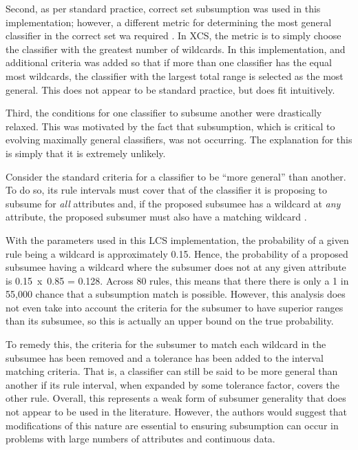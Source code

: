 \documentclass[11pt]{article}
\begin{document}
Second, as per standard practice, correct set subsumption was used in this implementation; however, a different metric for determining the most general classifier in the correct set wa required \cite{Butz2000}. In XCS, the metric is to simply choose the classifier with the greatest number of wildcards. In this implementation, and additional criteria was added so that if more than one classifier has the equal most wildcards, the classifier with the largest total range is selected as the most general. This does not appear to be standard practice, but does fit intuitively.

Third, the conditions for one classifier to subsume another were drastically relaxed. This was motivated by the fact that subsumption, which is critical to evolving maximally general classifiers, was not occurring. The explanation for this is simply that it is extremely unlikely.

Consider the standard criteria for a classifier to be ``more general'' than another. To do so, its rule intervals must cover that of the classifier it is proposing to subsume for \textit{all} attributes and, if the proposed subsumee has a wildcard at \textit{any} attribute, the proposed subsumer must also have a matching wildcard \cite{Sowden2007,Wilson2000}.

With the parameters used in this LCS implementation, the probability of a given rule being a wildcard is approximately 0.15. Hence, the probability of a proposed subsumee having a wildcard where the subsumer does not at any given attribute is 0.15~x~0.85 = 0.128. Across 80 rules, this means that there there is only a 1 in 55,000 chance that a subsumption match is possible. However, this analysis does not even take into account the criteria for the subsumer to have superior ranges than its subsumee, so this is actually an upper bound on the true probability.

To remedy this, the criteria for the subsumer to match each wildcard in the subsumee has been removed and a tolerance has been added to the interval matching criteria. That is, a classifier can still be said to be more general than another if its rule interval, when expanded by some tolerance factor, covers the other rule. Overall, this represents a weak form of subsumer generality that does not appear to be used in the literature. However, the authors would suggest that modifications of this nature are essential to ensuring subsumption can occur in problems with large numbers of attributes and continuous data.
\end{document}
